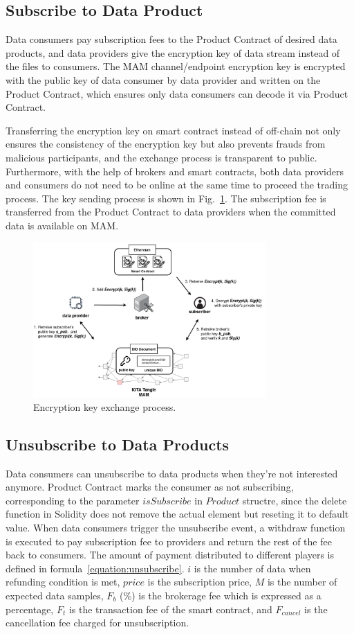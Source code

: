 \documentclass[conference]{IEEEtran}
\begin{document}
\subsection{Subscribe to Data Product}
Data consumers pay subscription fees to the Product Contract of desired data products, and data providers give the encryption key of data stream instead of the files to consumers. The MAM channel/endpoint encryption key is encrypted with the public key of data consumer by data provider and written on the Product Contract, which ensures only data consumers can decode it via Product Contract.

Transferring the encryption key on smart contract instead of off-chain not only ensures the consistency of the encryption key but also prevents frauds from malicious participants, and the exchange process is transparent to public. Furthermore, with the help of brokers and smart contracts, both data providers and consumers do not need to be online at the same time to proceed the trading process. The key sending process is shown in Fig.~\ref{fig:key_exchange}. The subscription fee is transferred from the Product Contract to data providers when the committed data is available on MAM.

\begin{figure}[!t]
    \centering
    \includegraphics[width=3.5in]{key_exchange}
    \caption{Encryption key exchange process.}
    \label{fig:key_exchange}
\end{figure}

\subsection{Unsubscribe to Data Products}
Data consumers can unsubscribe to data products when they're not interested anymore. Product Contract marks the consumer as not subscribing, corresponding to the parameter $isSubscribe$ in $Product$ structre, since the delete function in Solidity does not remove the actual element but reseting it to default value. When data consumers trigger the unsubscribe event, a withdraw function is executed to pay subscription fee to providers and return the rest of the fee back to consumers. The amount of payment distributed to different players is defined in formula~\ref{equation:unsubscribe}. $i$ is the number of data when refunding condition is met, $price$  is the subscription price, $M$ is the number of expected data samples, $F_{b}$ (\%) is the brokerage fee which is expressed as a percentage, $F_{t}$ is the transaction fee of the smart contract, and $F_{cancel}$ is the cancellation fee charged for unsubscription. 
\end{document}
